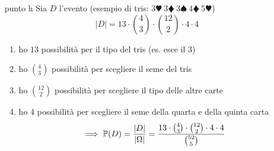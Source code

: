 \begin{enumerate}
\begin{enumerate}
	\end{enumerate}
	\item [punto h] Sia $D$ l'evento  (esempio di tris: $3\varheartsuit \ 3\vardiamondsuit \ 3\spadesuit \ 4\vardiamondsuit \ 5\varheartsuit $)
	\begin{equation*}
		| D| =13\cdot \binom{4}{3} \cdot \binom{12}{2} \cdot 4\cdot 4
	\end{equation*}
	\begin{enumerate}
		\item ho $13$ possibilità per il tipo del tris (es. esce il $3$)
		\item ho $\binom{4}{3}$ possibilità per scegliere il seme del tris
		\item ho $\binom{12}{2}$ possibilità per scegliere il tipo delle altre carte
		\item ho $4$ possibilità per scegliere il seme della quarta e della quinta carta
		\begin{equation*}
			\implies \mathbb{P}(D) =\frac{| D| }{| \Omega | } =\frac{13\cdot \binom{4}{3} \cdot \binom{12}{2} \cdot 4\cdot 4}{\binom{52}{5}}
		\end{equation*}
	\end{enumerate}
\end{enumerate}